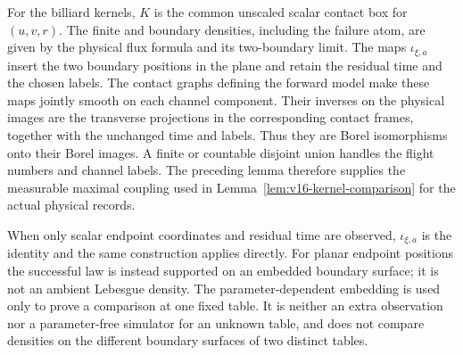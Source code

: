 For the billiard kernels, $K$ is the common unscaled scalar contact box
for $(u,v,r)$.  The finite and boundary densities, including the failure
atom, are given by the physical flux formula and its two-boundary limit.
The maps $\iota_{\xi,a}$ insert the two boundary positions in the plane
and retain the residual time and the chosen labels.  The contact graphs defining the forward model make these maps jointly
smooth on each channel component.
Their inverses on the physical images are the transverse projections in
the corresponding contact frames, together with the unchanged time and
labels.  Thus they are Borel isomorphisms onto their Borel images.
A finite or countable disjoint union
handles the flight numbers and channel labels.  The preceding lemma
therefore supplies the measurable maximal coupling used in
Lemma~\ref{lem:v16-kernel-comparison} for the actual physical records.

When only scalar endpoint coordinates and residual time are observed,
$\iota_{\xi,a}$ is the identity and the same construction applies directly.
For planar endpoint positions the successful law is instead supported on
an embedded boundary surface; it is not an ambient Lebesgue density.
The parameter-dependent embedding is used only to prove a comparison at
one fixed table.  It is neither an extra observation nor a parameter-free
simulator for an unknown table, and does not compare densities on the
different boundary surfaces of two distinct tables.

